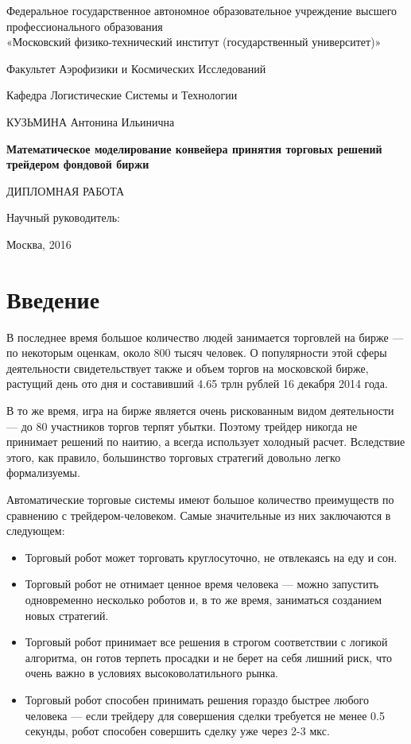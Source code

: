 \documentclass[12pt]{article}
\begin{document}
\thispagestyle{empty}
\begin{center}
\small{Федеральное государственное автономное образовательное учреждение высшего профессионального образования \\ «Московский физико-технический институт (государственный университет)»

Факультет Аэрофизики и Космических Исследований

Кафедра Логистические Системы и Технологии}

\parskip=80pt
КУЗЬМИНА Антонина Ильинична
\parskip=30pt

\textbf{\large{Математическое моделирование конвейера принятия торговых решений трейдером фондовой биржи}}

ДИПЛОМНАЯ РАБОТА
\end{center}

\begin{flushright}
\parskip=50pt
Научный руководитель:
\end{flushright}

\vspace{\fill}
\begin{center}
Москва, 2016
\end{center}
\newpage{}
\tableofcontents{}
\newpage{}
\renewcommand\thesection{}
\renewcommand\thesubsection{}
\renewcommand\thesubsubsection{}
\section{Введение}
В последнее время большое количество людей занимается торговлей на бирже — по
некоторым оценкам, около 800 тысяч человек. О популярности этой сферы деятельности
свидетельствует также и объем торгов на московской бирже, растущий день ото дня и
составивший 4.65 трлн рублей 16 декабря 2014 года.

В то же время, игра на бирже является очень рискованным видом деятельности — до 80%
участников торгов терпят убытки. Поэтому трейдер никогда не принимает решений по
наитию, а всегда использует холодный расчет. Вследствие этого, как правило, большинство
торговых стратегий довольно легко формализуемы.

Автоматические торговые системы имеют большое количество преимуществ по сравнению с
трейдером-человеком. Самые значительные из них заключаются в следующем:

\begin{itemize}
\item Торговый робот может торговать круглосуточно, не отвлекаясь на еду и сон.
\item Торговый робот не отнимает ценное время человека — можно запустить
одновременно несколько роботов и, в то же время, заниматься созданием новых
стратегий.
\item Торговый робот принимает все решения в строгом соответствии с логикой алгоритма,
он готов терпеть просадки и не берет на себя лишний риск, что очень важно в
условиях высоковолатильного рынка.
\item Торговый робот способен принимать решения гораздо быстрее любого человека —
если трейдеру для совершения сделки требуется не менее 0.5 секунды, робот способен
совершить сделку уже через 2-3 мкс.
\end{itemize}
\end{document}
